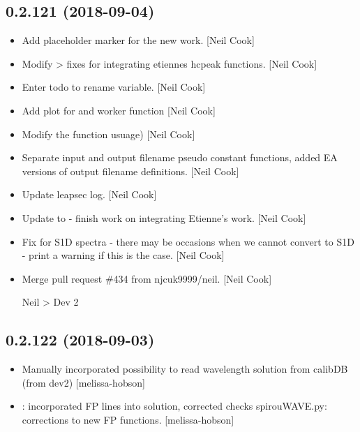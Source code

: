 \documentclass[a4paper,10pt,english]{report}
\begin{document}
\subsection{0.2.121 (2018-09-04)}
\label{\detokenize{misc/changelog:id341}}\begin{itemize}
\item {} 
Add placeholder marker for the new  work. {[}Neil
Cook{]}

\item {} 
Modify  \textendash{}\textgreater{} fixes for integrating etiennes
hcpeak functions. {[}Neil Cook{]}

\item {} 
Enter todo to rename variable. {[}Neil Cook{]}

\item {} 
Add plot for   and
worker function  {[}Neil Cook{]}

\item {} 
Modify the  function  usuage) {[}Neil Cook{]}

\item {} 
Separate input and output filename pseudo constant functions, added EA
versions of  output filename definitions. {[}Neil Cook{]}

\item {} 
Update leapsec log. {[}Neil Cook{]}

\item {} 
Update to  - finish work on integrating Etienne’s
work. {[}Neil Cook{]}

\item {} 
Fix for S1D spectra - there may be occasions when we cannot convert to
S1D - print a warning if this is the case. {[}Neil Cook{]}

\item {} 
Merge pull request \#434 from njcuk9999/neil. {[}Neil Cook{]}

Neil \textendash{}\textgreater{} Dev 2

\end{itemize}


\subsection{0.2.122 (2018-09-03)}
\label{\detokenize{misc/changelog:id342}}\begin{itemize}
\item {} 
Manually incorporated possibility to read wavelength solution from
calibDB (from dev2) {[}melissa-hobson{]}

\item {} 
: incorporated FP lines into solution,
corrected checks spirouWAVE.py: corrections to new FP functions.
{[}melissa-hobson{]}

\end{itemize}
\end{document}
